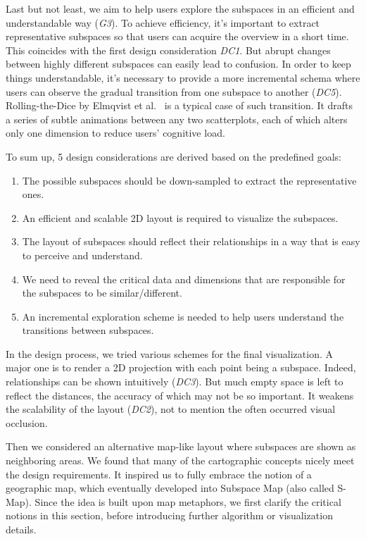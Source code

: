 Last but not least, we aim to help users explore the subspaces in an efficient and understandable way (\textit{G3}). To achieve efficiency, it's important to extract representative subspaces so that users can acquire the overview in a short time. This coincides with the first design consideration \textit{DC1}. But abrupt changes between highly different subspaces can easily lead to confusion. In order to keep things understandable, it's necessary to provide a more incremental schema where users can observe the gradual transition from one subspace to another (\textit{DC5}). Rolling-the-Dice by Elmqvist et al.~\cite{DBLP:journals/tvcg/ElmqvistDF08} is a typical case of such transition. It drafts a series of subtle animations between any two scatterplots, each of which alters only one dimension to reduce users' cognitive load. 

To sum up, 5 design considerations are derived based on the predefined goals:
\begin{enumerate} [\textbf{DC} 1:]
\item The possible subspaces should be down-sampled to extract the representative ones.
\item An efficient and scalable 2D layout is required to visualize the subspaces.
\item The layout of subspaces should reflect their relationships in a way that is easy to perceive and understand.
\item We need to reveal the critical data and dimensions that are responsible for the subspaces to be similar/different.
\item An incremental exploration scheme is needed to help users understand the transitions between subspaces.
\end{enumerate}

In the design process, we tried various schemes for the final visualization. A major one is to render a 2D projection with each point being a subspace. Indeed, relationships can be shown intuitively (\textit{DC3}). But much empty space is left to reflect the distances, the accuracy of which may not be so important. It weakens the scalability of the layout (\textit{DC2}), not to mention the often occurred visual occlusion.

Then we considered an alternative map-like layout where subspaces are shown as neighboring areas. We found that many of the cartographic concepts nicely meet the design requirements. It inspired us to fully embrace the notion of a geographic map, which eventually developed into Subspace Map (also called S-Map). Since the idea is built upon map metaphors, we first clarify the critical notions in this section, before introducing further algorithm or visualization details. 

